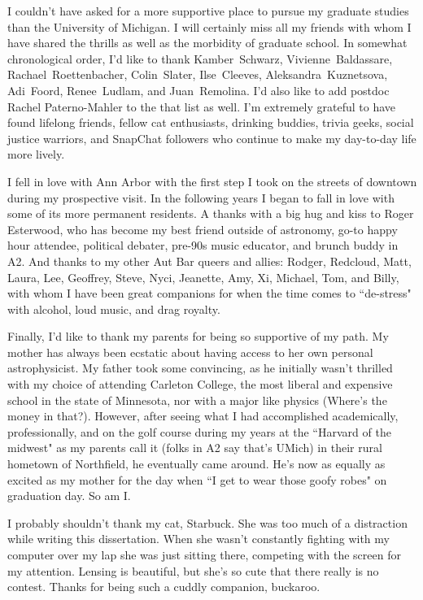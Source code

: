 I couldn't have asked for a more supportive place to pursue my graduate studies than the University of Michigan. I will certainly miss all my friends with whom I have shared the thrills as well as the morbidity of graduate school. In somewhat chronological order, I'd like to thank Kamber~Schwarz, Vivienne~Baldassare, Rachael~Roettenbacher, Colin~Slater, Ilse~Cleeves, Aleksandra~Kuznetsova, Adi~Foord, Renee~Ludlam, and Juan~Remolina. I'd also like to add postdoc Rachel Paterno-Mahler to the that list as well. I'm extremely grateful to have found lifelong friends, fellow cat enthusiasts, drinking buddies, trivia geeks, social justice warriors, and SnapChat followers who continue to make my day-to-day life more lively.

I fell in love with Ann Arbor with the first step I took on the streets of downtown during my prospective visit. In the following years I began to fall in love with some of its more permanent residents. A thanks with a big hug and kiss to Roger Esterwood, who has become my best friend outside of astronomy, go-to happy hour attendee, political debater, pre-90s music educator, and brunch buddy in A2. And thanks to my other Aut Bar queers and allies: Rodger, Redcloud, Matt, Laura, Lee, Geoffrey, Steve, Nyci, Jeanette, Amy, Xi, Michael, Tom, and Billy, with whom I have been great companions for when the time comes to ``de-stress" with alcohol, loud music, and drag royalty.

Finally, I'd like to thank my parents for being so supportive of my path. My mother has always been ecstatic about having access to her own personal astrophysicist. My father took some convincing, as he initially wasn't thrilled with my choice of attending Carleton College, the most liberal and expensive school in the state of Minnesota, nor with a major like physics (Where's the money in that?). However, after seeing what I had accomplished academically, professionally, and on the golf course during my years at the ``Harvard of the midwest" as my parents call it (folks in A2 say that's UMich) in their rural hometown of Northfield, he eventually came around. He's now as equally as excited as my mother for the day when ``I get to wear those goofy robes" on graduation day. So am I.

I probably shouldn't thank my cat, Starbuck. She was too much of a distraction while writing this dissertation. When she wasn't constantly fighting with my computer over my lap she was just sitting there, competing with the screen for my attention. Lensing is beautiful, but she's so cute that there really is no contest. Thanks for being such a cuddly companion, buckaroo.
